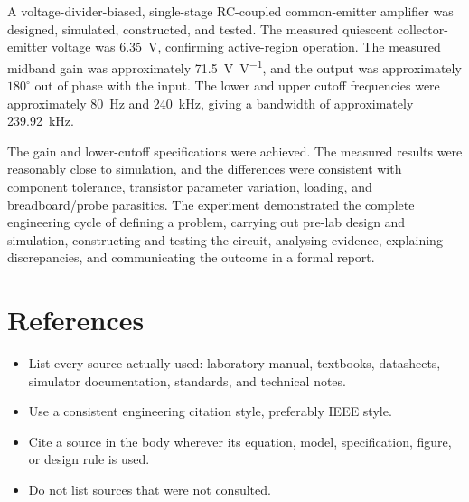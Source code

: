\documentclass[11pt,a4paper]{article}
\begin{document}
\begin{examplebox}
A voltage-divider-biased, single-stage RC-coupled common-emitter amplifier
was designed, simulated, constructed, and tested. The measured quiescent
collector-emitter voltage was \SI{6.35}{\volt}, confirming active-region
operation. The measured midband gain was approximately
\SI{71.5}{\volt\per\volt}, and the output was approximately
$180^\circ$ out of phase with the input. The lower and upper cutoff
frequencies were approximately \SI{80}{\hertz} and
\SI{240}{\kilo\hertz}, giving a bandwidth of approximately
\SI{239.92}{\kilo\hertz}.

The gain and lower-cutoff specifications were achieved. The measured results
were reasonably close to simulation, and the differences were consistent
with component tolerance, transistor parameter variation, loading, and
breadboard/probe parasitics. The experiment demonstrated the complete
engineering cycle of defining a problem, carrying out pre-lab design and
simulation, constructing and testing the circuit, analysing evidence,
explaining discrepancies, and communicating the outcome in a formal report.
\end{examplebox}

\section{References}
\begin{sectionguide}
\begin{itemize}
  \item List every source actually used: laboratory manual, textbooks,
        datasheets, simulator documentation, standards, and technical notes.
  \item Use a consistent engineering citation style, preferably IEEE style.
  \item Cite a source in the body wherever its equation, model, specification,
        figure, or design rule is used.
  \item Do not list sources that were not consulted.
\end{itemize}
\end{sectionguide}
\end{document}
